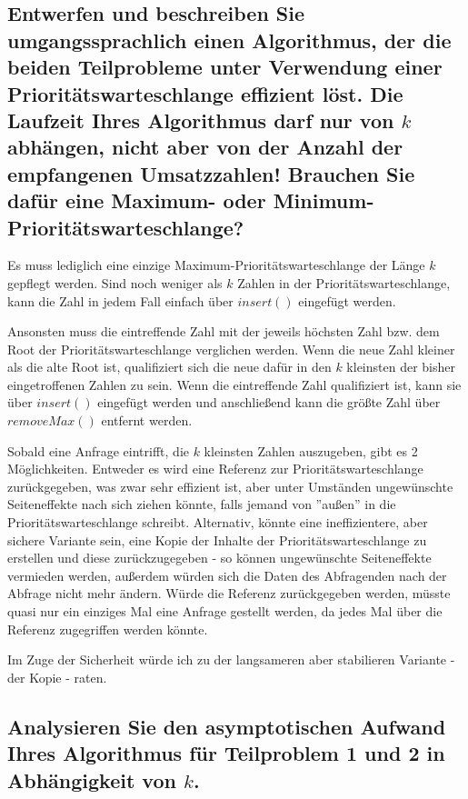 \documentclass{article}
\begin{document}
\subsection{Entwerfen und beschreiben Sie umgangssprachlich einen Algorithmus,
der die beiden Teilprobleme unter Verwendung einer Prioritätswarteschlange
effizient löst. Die Laufzeit Ihres Algorithmus darf nur von $k$ abhängen,
nicht aber von der Anzahl der empfangenen Umsatzzahlen!  Brauchen Sie dafür
eine Maximum- oder Minimum-Prioritätswarteschlange?}

Es muss lediglich eine einzige Maximum-Prioritätswarteschlange der Länge $k$
gepflegt werden.  Sind noch weniger als $k$ Zahlen in der
Prioritätswarteschlange, kann die Zahl in jedem Fall einfach über $insert()$
eingefügt werden.

Ansonsten muss die eintreffende Zahl mit der jeweils höchsten Zahl bzw. dem
Root der Prioritätswarteschlange verglichen werden. Wenn die neue Zahl kleiner
als die alte Root ist, qualifiziert sich die neue dafür in den $k$ kleinsten
der bisher eingetroffenen Zahlen zu sein. Wenn die eintreffende Zahl
qualifiziert ist, kann sie über $insert()$ eingefügt werden und anschließend
kann die größte Zahl über $removeMax()$ entfernt werden.

Sobald eine Anfrage eintrifft, die $k$ kleinsten Zahlen auszugeben, gibt es 2
Möglichkeiten.  Entweder es wird eine Referenz zur Prioritätswarteschlange
zurückgegeben, was zwar sehr effizient ist, aber unter Umständen ungewünschte
Seiteneffekte nach sich ziehen könnte, falls jemand von ''außen'' in die
Prioritätswarteschlange schreibt. Alternativ, könnte eine ineffizientere, aber
sichere Variante sein, eine Kopie der Inhalte der Prioritätswarteschlange zu
erstellen und diese zurückzugegeben - so können ungewünschte Seiteneffekte
vermieden werden, außerdem würden sich die Daten des Abfragenden nach der
Abfrage nicht mehr ändern. Würde die Referenz zurückgegeben werden, müsste
quasi nur ein einziges Mal eine Anfrage gestellt werden, da jedes Mal über die
Referenz zugegriffen werden könnte.

Im Zuge der Sicherheit würde ich zu der langsameren aber stabilieren Variante -
der Kopie - raten.

\subsection{Analysieren Sie den asymptotischen Aufwand Ihres Algorithmus für
Teilproblem 1 und 2 in Abhängigkeit von $k$.}
\end{document}
